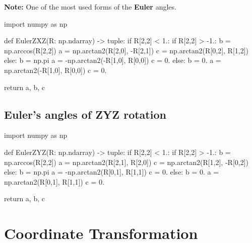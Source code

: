         \textbf{Note:} One of the most used forms of the \textbf{Euler} angles.

\begin{python}
import numpy as np

def EulerZXZ(R: np.ndarray) -> tuple:
    if R[2,2] < 1.:
        if R[2,2] > -1.:
            b = np.arccos(R[2,2])
            a = np.arctan2(R[2,0], -R[2,1])
            c = np.arctan2(R[0,2], R[1,2])
        else:
            b = np.pi
            a = -np.arctan2(-R[1,0], R[0,0])
            c = 0.
    else:
        b = 0.
        a = np.arctan2(-R[1,0], R[0,0])
        c = 0.

    return a, b, c
\end{python}

\subsection{Euler's angles of \textbf{ZYZ} rotation}

\begin{python}
import numpy as np

def EulerZYZ(R: np.ndarray) -> tuple:
    if R[2,2] < 1.:
        if R[2,2] > -1.:
            b = np.arccos(R[2,2])
            a = np.arctan2(R[2,1], R[2,0])
            c = np.arctan2(R[1,2], -R[0,2])
        else:
            b = np.pi
            a = -np.arctan2(R[0,1], R[1,1])
            c = 0.
    else:
        b = 0.
        a = np.arctan2(R[0,1], R[1,1])
        c = 0.

    return a, b, c
\end{python}


\section{Coordinate Transformation}

